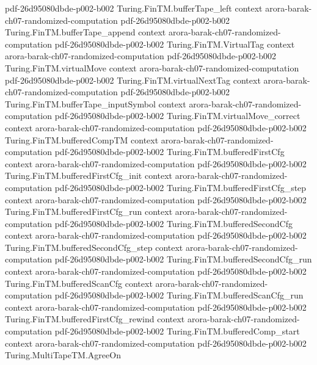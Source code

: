 \begin{theorem}
  {pdf-26d95080dbde-p002-b002}
\proofstep
  {Turing.FinTM.bufferTape_left}
  {context}
  {arora-barak-ch07-randomized-computation}
  {pdf-26d95080dbde-p002-b002}
\proofstep
  {Turing.FinTM.bufferTape_append}
  {context}
  {arora-barak-ch07-randomized-computation}
  {pdf-26d95080dbde-p002-b002}
\proofstep
  {Turing.FinTM.VirtualTag}
  {context}
  {arora-barak-ch07-randomized-computation}
  {pdf-26d95080dbde-p002-b002}
\proofstep
  {Turing.FinTM.virtualMove}
  {context}
  {arora-barak-ch07-randomized-computation}
  {pdf-26d95080dbde-p002-b002}
\proofstep
  {Turing.FinTM.virtualNextTag}
  {context}
  {arora-barak-ch07-randomized-computation}
  {pdf-26d95080dbde-p002-b002}
\proofstep
  {Turing.FinTM.bufferTape_inputSymbol}
  {context}
  {arora-barak-ch07-randomized-computation}
  {pdf-26d95080dbde-p002-b002}
\proofstep
  {Turing.FinTM.virtualMove_correct}
  {context}
  {arora-barak-ch07-randomized-computation}
  {pdf-26d95080dbde-p002-b002}
\proofstep
  {Turing.FinTM.bufferedCompTM}
  {context}
  {arora-barak-ch07-randomized-computation}
  {pdf-26d95080dbde-p002-b002}
\proofstep
  {Turing.FinTM.bufferedFirstCfg}
  {context}
  {arora-barak-ch07-randomized-computation}
  {pdf-26d95080dbde-p002-b002}
\proofstep
  {Turing.FinTM.bufferedFirstCfg_init}
  {context}
  {arora-barak-ch07-randomized-computation}
  {pdf-26d95080dbde-p002-b002}
\proofstep
  {Turing.FinTM.bufferedFirstCfg_step}
  {context}
  {arora-barak-ch07-randomized-computation}
  {pdf-26d95080dbde-p002-b002}
\proofstep
  {Turing.FinTM.bufferedFirstCfg_run}
  {context}
  {arora-barak-ch07-randomized-computation}
  {pdf-26d95080dbde-p002-b002}
\proofstep
  {Turing.FinTM.bufferedSecondCfg}
  {context}
  {arora-barak-ch07-randomized-computation}
  {pdf-26d95080dbde-p002-b002}
\proofstep
  {Turing.FinTM.bufferedSecondCfg_step}
  {context}
  {arora-barak-ch07-randomized-computation}
  {pdf-26d95080dbde-p002-b002}
\proofstep
  {Turing.FinTM.bufferedSecondCfg_run}
  {context}
  {arora-barak-ch07-randomized-computation}
  {pdf-26d95080dbde-p002-b002}
\proofstep
  {Turing.FinTM.bufferedScanCfg}
  {context}
  {arora-barak-ch07-randomized-computation}
  {pdf-26d95080dbde-p002-b002}
\proofstep
  {Turing.FinTM.bufferedScanCfg_run}
  {context}
  {arora-barak-ch07-randomized-computation}
  {pdf-26d95080dbde-p002-b002}
\proofstep
  {Turing.FinTM.bufferedFirstCfg_rewind}
  {context}
  {arora-barak-ch07-randomized-computation}
  {pdf-26d95080dbde-p002-b002}
\proofstep
  {Turing.FinTM.bufferedComp_start}
  {context}
  {arora-barak-ch07-randomized-computation}
  {pdf-26d95080dbde-p002-b002}
\proofstep
  {Turing.MultiTapeTM.AgreeOn}

\end{theorem}
